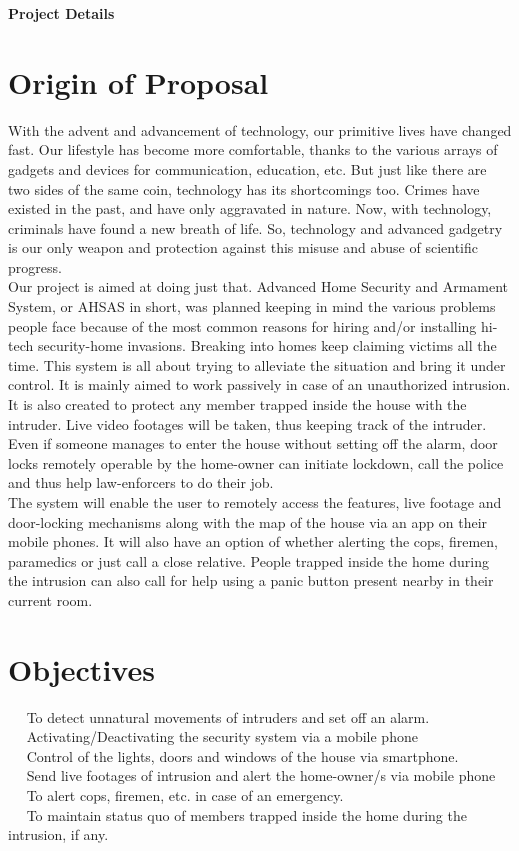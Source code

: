 \documentclass[margin, centered]{res}
\begin{document}
\begin{resume}
\textbf{Project Details}
\section{Origin of Proposal} 
With the advent and advancement of technology, our primitive lives have changed fast. Our lifestyle has become more comfortable, thanks to the various arrays of gadgets and devices for communication, education, etc. But just like there are two sides of the same coin, technology has its shortcomings too. Crimes have existed in the past, and have only aggravated in nature. Now, with technology, criminals have found a new breath of life. So, technology and advanced gadgetry is our only weapon and protection against this misuse and abuse of scientific progress.\\
Our project is aimed at doing just that. Advanced Home Security and Armament System, or AHSAS in short, was planned keeping in mind the various problems people face because of the most common reasons for hiring and/or installing hi-tech security-home invasions. Breaking into homes keep claiming victims all the time. This system is all about trying to alleviate the situation and bring it under control. It is mainly aimed to work passively in case of an unauthorized intrusion. It is also created to protect any member trapped inside the house with the intruder. Live video footages will be taken, thus keeping track of the intruder. Even if someone manages to enter the house without setting off the alarm, door locks remotely operable by the home-owner can initiate lockdown, call the police and thus help law-enforcers to do their job.\\
The system will enable the user to remotely access the features, live footage and door-locking mechanisms along with the map of the house via an app on their mobile phones. It will also have an option of whether alerting the cops, firemen, paramedics or just call a close relative. People trapped inside the home during the intrusion can also call for help using a panic button present nearby in their current room.
\section{Objectives}
~\textbullet~ To detect unnatural movements of intruders and set off an alarm.\\
~\textbullet~ Activating/Deactivating the security system via a mobile phone\\
~\textbullet~ Control of the lights, doors and windows of the house via smartphone.\\
~\textbullet~ Send live footages of intrusion and alert the home-owner/s via mobile phone\\
~\textbullet~ To alert cops, firemen, etc. in case of an emergency.\\
~\textbullet~ To maintain status quo of members trapped inside the home during the intrusion, if any.


\end{resume}
\end{document}
